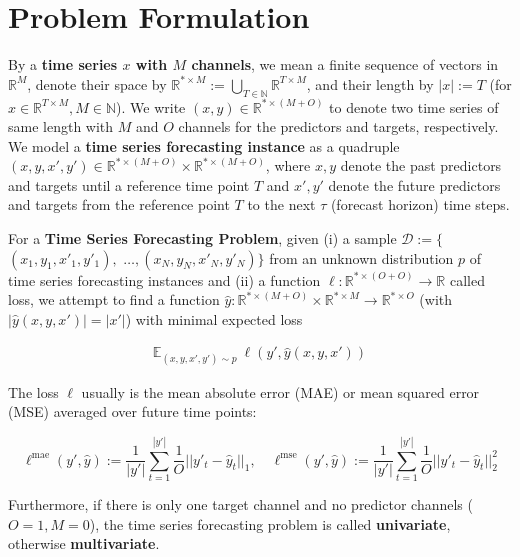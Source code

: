 
\section{Problem Formulation}
By a \textbf{time series $x$ with $M$ channels}, we mean a finite sequence of
  vectors in $\mathbb{R}^M$,
denote their space by
  $\mathbb{R}^{*\times M}:= \bigcup_{T\in \mathbb{N}} \mathbb{R}^{T\times M}$,
and their length by $|x|:= T$ (for $x\in \mathbb{R}^{T\times M}, M\in\mathbb{N}$).
We write $(x,y)\in \mathbb{R}^{*\times (M+O)}$ to denote two time series
of same length with $M$ and $O$ channels for the predictors and targets, respectively. 
We model a \textbf{time series forecasting instance} as a quadruple $(x,y,x',y')\in\mathbb{R}^{*\times (M+O)}\times \mathbb{R}^{*\times (M+O)}$, where $x,y$ denote the past predictors and targets until a reference time point $T$ and $x',y'$ denote the future predictors and targets from the reference point $T$ to the next $\tau$ (forecast horizon) time steps.

For a \textbf{Time Series Forecasting Problem}, given (i) a sample $\mathcal{D}:=\{$ $(x_1,y_1,x'_1,y'_1),$ $\ldots,(x_N,y_N,x'_N,y'_N)\}$ from an unknown distribution $p$ of time series forecasting instances and (ii) a function $\ell: \mathbb{R}^{*\times (O+O)} \rightarrow\mathbb{R}$ called loss, we attempt to find a function $\hat y:\mathbb{R}^{*\times (M+O)}\times \mathbb{R}^{*\times M}\rightarrow \mathbb{R}^{*\times O}$ (with $|\hat y(x,y,x')|=|x'|$) with minimal expected loss

\begin{equation}
    \begin{aligned}
       \mathbb{E}_{(x,y,x',y')\sim p}\ \ell(y', \hat y(x,y,x'))
    \end{aligned}
\end{equation}

The loss $\ell$ usually is the mean absolute error (MAE) or mean squared error (MSE) averaged over future time points:

\begin{equation}
   \ell^{\text{mae}}(y', \hat y) :=
    \frac{1}{|y'|}\sum_{t=1}^{|y'|} \frac{1}{O} ||y'_t-\hat y_t||_1, \quad
    \ell^{\text{mse}}(y', \hat y) :=
    \frac{1}{|y'|}\sum_{t=1}^{|y'|} \frac{1}{O} ||y'_t-\hat y_t||_2^2
\label{eqn:msemae}
\end{equation}

Furthermore, if there is only one target channel and no predictor channels ($O=1, M=0$),
the time series forecasting problem is called \textbf{univariate}, otherwise \textbf{multivariate}.

